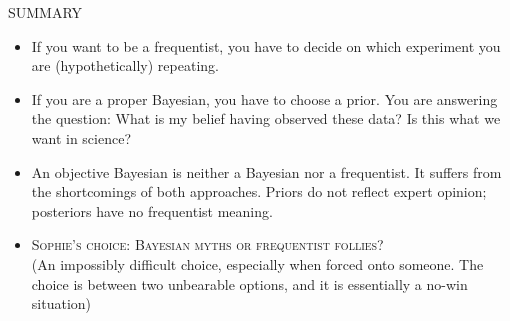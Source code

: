 \documentclass[10pt]{beamer}
\begin{document}
\begin{frame}
\begin{center}
\LARGE SUMMARY
\end{center}
\begin{itemize}
\item If you want to be a frequentist, you have to decide on which experiment you are (hypothetically) repeating.
\item If you are a proper Bayesian, you have to choose a prior. You are answering the question: What is my belief having observed these data? \alert {Is this what we want in science?}
\item An objective Bayesian is neither a Bayesian nor a frequentist. It suffers from the shortcomings of both approaches. Priors do not reflect expert opinion; posteriors have no frequentist meaning. 
\item \alert {\textsc {Sophie's choice: Bayesian myths or frequentist follies?}}\\
\vspace{5mm}
 \tiny{(An impossibly difficult choice, especially when forced onto someone. The choice is between two unbearable options, and it is essentially a no-win situation)}
\end{itemize}
\end{frame}
\end{document}
